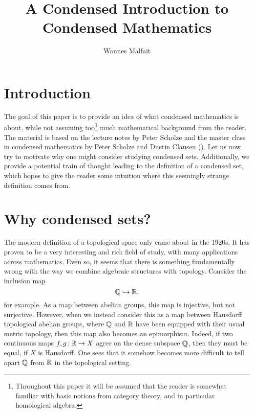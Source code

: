 \documentclass{article}
\title{A Condensed Introduction to Condensed Mathematics}
\author{Wannes Malfait}
\date{}
\begin{document}
\maketitle


\section{Introduction}

The goal of this paper is to provide
an idea of what condensed mathematics is about,
while not assuming too\footnote{
    Throughout this paper it will be assumed that the reader
    is somewhat familiar with basic notions from
    category theory, and in particular homological
    algebra.
} much mathematical background
from the reader.
The material is based on the lecture
notes by Peter Scholze and the master class in
condensed mathematics by
Peter Scholze and Dustin
Clausen (\cite{Sch2019LecturesCM,Sch2020MasterClass}).
Let us now try to motivate why one might
consider studying condensed sets. Additionally,
we provide a potential train of thought leading to the
definition of a condensed set, which
hopes to give the reader some intuition where
this seemingly strange definition comes from.

\section{Why condensed sets?}

The modern definition of a topological space
only came about in the 1920s. It has proven
to be a very interesting and rich field of study,
with many applications across mathematics. Even so,
it seems that there is something fundamentally wrong
with the way we combine algebraic structures with
topology. Consider the inclusion map
\begin{equation*}
    \mathbb{Q} \hookrightarrow \mathbb{R},
\end{equation*}
for example. As a map between abelian groups,
this map is injective, but not surjective. However,
when we instead consider this as a map between
Hausdorff topological abelian groups, where $\mathbb{Q}$ and $\mathbb{R}$
have been equipped with their usual metric topology,
then this map also becomes an epimorphism. Indeed,
if two continuous maps $f,g\colon \mathbb{R} \to X$ agree
on the dense subspace $\mathbb{Q}$, then they must be equal,
if $X$ is Hausdorff. One sees that it somehow becomes
more difficult to tell apart $\mathbb{Q}$ from $\mathbb{R}$
in the topological setting.
\end{document}
